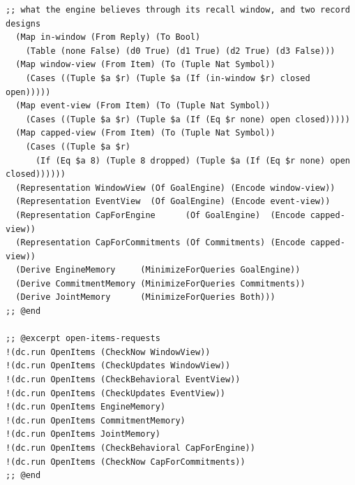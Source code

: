 \documentclass[11pt]{article}
\theoremstyle{definition}
\theoremstyle{plain}
\begin{document}
\begin{lstlisting}[style=mettafull]
  ;; what the engine believes through its recall window, and two record designs
  (Map in-window (From Reply) (To Bool)
    (Table (none False) (d0 True) (d1 True) (d2 True) (d3 False)))
  (Map window-view (From Item) (To (Tuple Nat Symbol))
    (Cases ((Tuple $a $r) (Tuple $a (If (in-window $r) closed open)))))
  (Map event-view (From Item) (To (Tuple Nat Symbol))
    (Cases ((Tuple $a $r) (Tuple $a (If (Eq $r none) open closed)))))
  (Map capped-view (From Item) (To (Tuple Nat Symbol))
    (Cases ((Tuple $a $r)
      (If (Eq $a 8) (Tuple 8 dropped) (Tuple $a (If (Eq $r none) open closed))))))
  (Representation WindowView (Of GoalEngine) (Encode window-view))
  (Representation EventView  (Of GoalEngine) (Encode event-view))
  (Representation CapForEngine      (Of GoalEngine)  (Encode capped-view))
  (Representation CapForCommitments (Of Commitments) (Encode capped-view))
  (Derive EngineMemory     (MinimizeForQueries GoalEngine))
  (Derive CommitmentMemory (MinimizeForQueries Commitments))
  (Derive JointMemory      (MinimizeForQueries Both)))
;; @end

;; @excerpt open-items-requests
!(dc.run OpenItems (CheckNow WindowView))
!(dc.run OpenItems (CheckUpdates WindowView))
!(dc.run OpenItems (CheckBehavioral EventView))
!(dc.run OpenItems (CheckUpdates EventView))
!(dc.run OpenItems EngineMemory)
!(dc.run OpenItems CommitmentMemory)
!(dc.run OpenItems JointMemory)
!(dc.run OpenItems (CheckBehavioral CapForEngine))
!(dc.run OpenItems (CheckNow CapForCommitments))
;; @end


\end{lstlisting}
\end{document}
